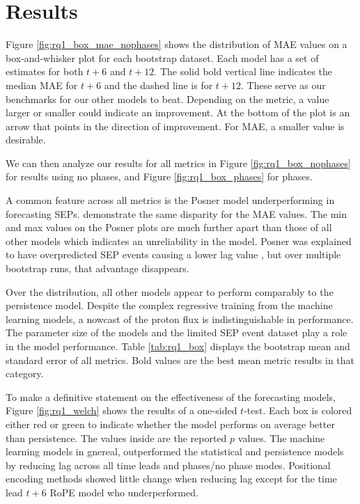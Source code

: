 \section{Results}
\label{sec:results}
Figure \ref{fig:rq1_box_mae_nophases} shows the distribution of MAE values on a box-and-whisker plot for each 
bootstrap dataset. Each model has a set of estimates for both $t+6$ and $t+12$.  The solid bold vertical line indicates the 
median MAE for $t+6$ and the dashed line is for $t+12$. These serve as our benchmarks for our other models to beat. Depending on the metric,
a value larger or smaller could indicate an improvement. At the bottom of the plot is an arrow that points in the direction of improvement. For 
MAE, a smaller value is desirable.

We can then analyze our results for all metrics in Figure \ref{fig:rq1_box_nophases} for results using no phases, and Figure \ref{fig:rq1_box_phases} for phases.


A common feature across all metrics is the Posner model underperforming in forecasting SEPs.  demonstrate the same disparity 
for the MAE values. The min and max values on the Posner plots are much further apart than those of all other models which indicates an
unreliability in the model. Posner was explained to have overpredicted SEP events causing a lower lag value \cite{torres2025machine}, but over multiple bootstrap runs, 
that advantage disappears.

Over the distribution, all other models appear to perform comparably to the persistence model. Despite the complex regressive training from the machine learning models, a nowcast of the proton flux is 
indistinguishable in performance. The parameter size of the models and the limited SEP event dataset 
play a role in the model performance. Table \ref{tab:rq1_box} displays the bootstrap mean and standard error of all metrics.    
Bold values are the best mean metric results in that category.


To make a definitive statement on the effectiveness of the forecasting models, Figure \ref{fig:rq1_welch} shows the results of a one-sided $t$-test. Each box is colored either red or green to indicate whether the model 
performs on average better than persistence. The values inside are the reported $p$ values. The machine learning models in gnereal, outperformed the statistical and persistence models by reducing lag across all time leads and phases/no phase modes.
Positional encoding methods showed little change when reducing lag except for the time lead $t+6$ RoPE model who underperformed.


